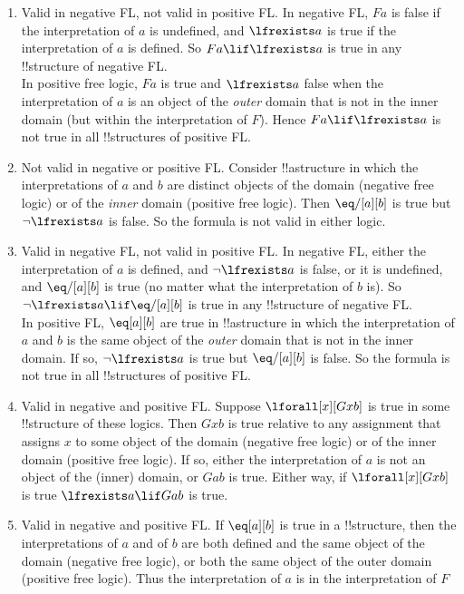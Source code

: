 \documentclass[../../../include/open-logic-section]{subfiles}
\begin{document}
\begin{prob}
\begin{ans}
\begin{enumerate}
\item Valid in negative FL, not valid in positive FL. In negative FL,
	$Fa$ is false if the  interpretation of $a$ is undefined, and
	$\lfrexists a$ is true if the interpretation of $a$ is defined. So
	$Fa\lif \lfrexists a$ is true in any !!{structure} of negative
	FL.\\ 
	In positive free logic, $Fa$ is true and $\lfrexists a$ false when
	the interpretation of  $a$ is an object of the \emph{outer} domain
	that is not in the inner domain (but within the interpretation of
	$F$). Hence $Fa\lif \lfrexists a$ is not true in all
	!!{structure}s of positive FL. 
\item Not valid in negative or positive FL. Consider !!a{structure} in
	which the  interpretations of $a$ and $b$ are distinct objects of
	the domain (negative free logic) or of the \emph{inner} domain
	(positive free logic). Then $\eq/[a][b]$ is true but $\lnot
	\lfrexists a$ is false. So the formula is not valid in either
	logic. 
\item Valid in negative FL, not valid in positive FL. In negative FL,
	either the interpretation of $a$ is defined, and $\lnot \lfrexists
	a$ is false, or it is undefined, and $\eq/[a][b]$ is true (no
	matter what the interpretation of $b$ is). So $\lnot \lfrexists
	a\lif\eq/[a][b]$ is true in any !!{structure} of negative
	FL.\\ 
	In positive FL, $\eq[a][b]$ are true in !!a{structure} in which
	the interpretation of $a$ and $b$ is the same object of the
	\emph{outer} domain that is not in the inner domain. If so, $\lnot
	\lfrexists a $ is true but $\eq/[a][b]$ is false. So the
	formula is not true in all !!{structure}s of positive FL.
\item Valid in negative and positive FL. Suppose $\lforall[x][Gxb]$ is
	true in some !!{structure} of these logics. Then $Gxb$ is true
	relative to any assignment that assigns $x$ to some object of the
	domain (negative free logic) or of the inner domain (positive free
	logic). If so, either the interpretation of $a$ is not an object
	of the (inner) domain, or $Gab$ is true. Either way, if
	$\lforall[x][Gxb]$ is true $\lfrexists a \lif Gab$ is true.
\item Valid in negative and positive FL. If $\eq[a][b]$ is true in a
	!!{structure}, then the interpretations of $a$ and of $b$ are both
	defined and the same object of the domain (negative free logic),
	or both the same object of the outer domain (positive free logic).
	Thus the interpretation of $a$ is in the interpretation of $F$

\end{enumerate}
\end{ans}
\end{prob}
\end{document}
